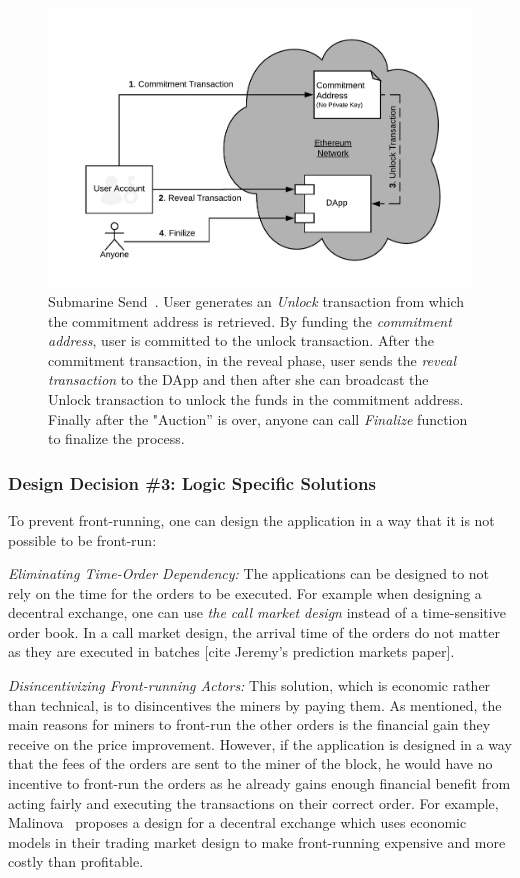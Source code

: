 \begin{figure}[h]
\centering
\includegraphics[width=0.5\linewidth]{figures/LibSubmarine.png}
\caption{ Submarine Send~\cite{libsubmarine}. User generates an \textit{Unlock} transaction from which the commitment address is retrieved. By funding the \textit{commitment address}, user is committed to the unlock transaction. After the commitment transaction, in the reveal phase, user sends the \textit{reveal transaction} to the DApp and then after she can broadcast the Unlock transaction to unlock the funds in the commitment address. Finally after the "Auction'' is over, anyone can call \textit{Finalize} function to finalize the process.  \label{fig:LibSubmarine}}
\end{figure}


\subsubsection{Design Decision \#3: Logic Specific Solutions\newline}
To prevent front-running, one can design the application in a way that it is not possible to be front-run:

\noindent\emph{Eliminating Time-Order Dependency:} The applications can be designed to not rely on the time for the orders to be executed. For example when designing a decentral exchange, one can use \emph{the call market design} instead of a time-sensitive order book. In a call market design, the arrival time of the orders do not matter as they are executed in batches [cite Jeremy's prediction markets paper]. 

\noindent\emph{Disincentivizing Front-running Actors:} This solution, which is economic rather than technical, is to disincentives the miners by paying them. As mentioned, the main reasons for miners to front-run the other orders is the financial gain they receive on the price improvement. However, if the application is designed in a way that the fees of the orders are sent to the miner of the block, he would have no incentive to front-run the orders as he already gains enough financial benefit from acting fairly and executing the transactions on their correct order. For example, Malinova~\cite{malinova2017market} proposes a design for a decentral exchange which uses economic models in their trading market design to make front-running expensive and more costly than profitable. 


